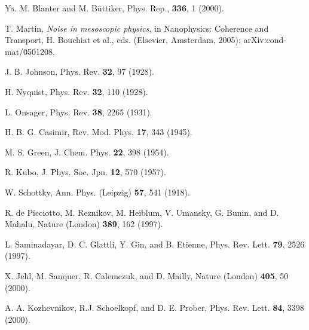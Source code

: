 \documentclass[aps,prl,reprint,showpacs]{revtex4-1}
\begin{document}
\begin{thebibliography}{10}

Ya. M. Blanter and M. B\"uttiker, Phys. Rep., {\bf 336}, 1 (2000).

 T. Martin, {\it Noise in mesoscopic physics}, in Nanophysics: Coherence and Transport, H. Bouchiat et al., eds. (Elsevier, Amsterdam, 2005); arXiv:cond-mat/0501208.

J. B. Johnson, Phys. Rev. {\bf 32}, 97 (1928).

H. Nyquist, Phys. Rev. {\bf 32}, 110 (1928).

L. Onsager, Phys. Rev. {\bf 38}, 2265 (1931).

H. B. G. Casimir, Rev. Mod. Phys. {\bf 17}, 343 (1945).

M. S. Green, J. Chem. Phys. {\bf 22}, 398 (1954).

R. Kubo, J. Phys. Soc. Jpn. {\bf 12}, 570 (1957).

W. Schottky, Ann. Phys. (Leipzig) {\bf 57}, 541 (1918).

R. de Picciotto, M. Reznikov, M. Heiblum, V. Umansky, G. Bunin, and D. Mahalu, Nature (London) {\bf 389}, 162 (1997).

L. Saminadayar, D. C. Glattli, Y. Gin, and B. Etienne, Phys. Rev. Lett. {\bf 79}, 2526 (1997).

X. Jehl, M. Sanquer, R. Calemczuk, and D. Mailly, Nature (London) {\bf 405}, 50 (2000).

A. A. Kozhevnikov, R.J. Schoelkopf, and D. E. Prober, Phys. Rev. Lett. {\bf 84}, 3398 (2000).


\end{thebibliography}
\end{document}
